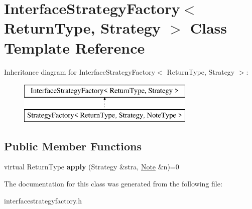 \hypertarget{class_interface_strategy_factory}{\section{Interface\-Strategy\-Factory$<$ Return\-Type, Strategy $>$ Class Template Reference}
\label{class_interface_strategy_factory}
}
Inheritance diagram for Interface\-Strategy\-Factory$<$ Return\-Type, Strategy $>$\-:\begin{figure}[H]
\begin{center}
\leavevmode
\includegraphics[height=2.000000cm]{class_interface_strategy_factory}
\end{center}
\end{figure}
\subsection*{Public Member Functions}
\begin{DoxyCompactItemize}
\item 
\hypertarget{class_interface_strategy_factory_af715a5e88b981c4ba53b9f7bd322adaa}{virtual Return\-Type {\bfseries apply} (Strategy \&stra, \hyperlink{class_note}{Note} \&n)=0}\label{class_interface_strategy_factory_af715a5e88b981c4ba53b9f7bd322adaa}

\end{DoxyCompactItemize}


The documentation for this class was generated from the following file\-:\begin{DoxyCompactItemize}
\item 
interfacestrategyfactory.\-h\end{DoxyCompactItemize}
